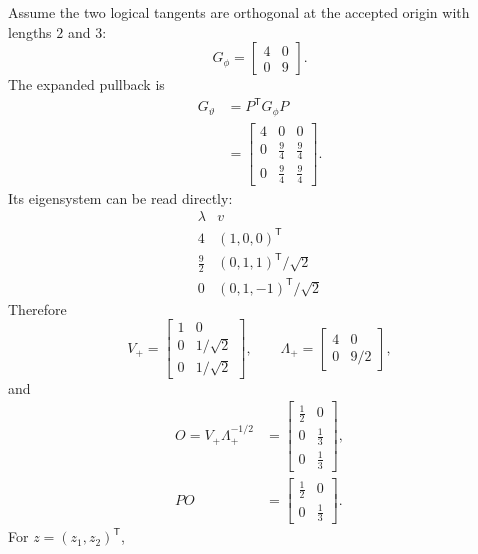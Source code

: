\documentclass[10pt,twocolumn]{article}
\begin{document}
Assume the two logical tangents are orthogonal at the accepted origin with
lengths \(2\) and \(3\):
\begin{equation}
G_\phi=
\begin{bmatrix}4&0\\0&9\end{bmatrix}.
\label{eq:toy-logical-gram}
\end{equation}
The expanded pullback is
\begin{align}
G_\vartheta
&=P^{\mathsf T}G_\phi P\nonumber\\
&=\begin{bmatrix}
4&0&0\\
0&\tfrac94&\tfrac94\\
0&\tfrac94&\tfrac94
\end{bmatrix}.
\label{eq:toy-runtime-gram}
\end{align}
Its eigensystem can be read directly:
\begin{equation}
\begin{array}{c|c}
\lambda&v\\ \hline
4&(1,0,0)^{\mathsf T}\\
\tfrac92&(0,1,1)^{\mathsf T}/\sqrt2\\
0&(0,1,-1)^{\mathsf T}/\sqrt2
\end{array}
\label{eq:toy-eigensystem}
\end{equation}
Therefore
\begin{equation}
V_+=
\begin{bmatrix}
1&0\\
0&1/\sqrt2\\
0&1/\sqrt2
\end{bmatrix},\qquad
\Lambda_+=
\begin{bmatrix}
4&0\\0&9/2
\end{bmatrix},
\label{eq:toy-supported-factors}
\end{equation}
and
\begin{align}
O=V_+\Lambda_+^{-1/2}
&=\begin{bmatrix}
\tfrac12&0\\
0&\tfrac13\\
0&\tfrac13
\end{bmatrix},\nonumber\\
PO&=\begin{bmatrix}
\tfrac12&0\\
0&\tfrac13
\end{bmatrix}.
\label{eq:toy-orthonormalizer}
\end{align}
For \(z=(z_1,z_2)^{\mathsf T}\),
\end{document}
